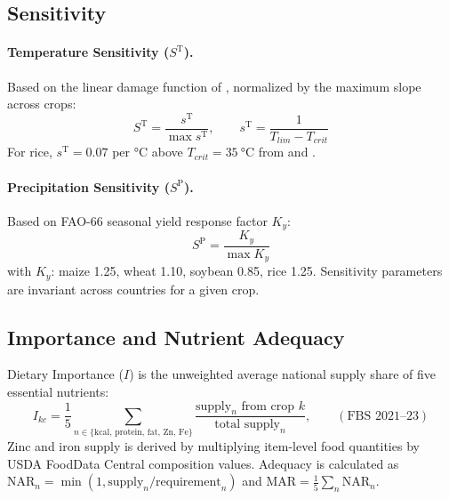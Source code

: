\documentclass[11pt,a4paper]{article}
\let\textcite\citet
\newcommand{\TT}{\mathrm{T}}   %
\newcommand{\PP}{\mathrm{P}}   %
\begin{document}
\subsection{Sensitivity}
\paragraph{Temperature Sensitivity ($S^{\TT}$).} Based on the linear damage function of \textcite{deryng2014}, normalized by the maximum slope across crops:
\begin{equation}
S^{\TT} = \frac{s^{\TT}}{\max s^{\TT}},\qquad s^{\TT} = \frac{1}{T_{lim} - T_{crit}}
\end{equation}
For rice, $s^{\TT} = 0.07$ per \si{\celsius} above $T_{crit}=\SI{35}{\celsius}$ from \textcite{jagadish2007} and \textcite{yoshida1981}.

\paragraph{Precipitation Sensitivity ($S^{\PP}$).} Based on FAO-66 seasonal yield response factor $K_y$:
\begin{equation}
S^{\PP} = \frac{K_y}{\max K_y}
\end{equation}
with $K_y$: maize 1.25, wheat 1.10, soybean 0.85, rice 1.25. Sensitivity parameters are invariant across countries for a given crop.

\begin{table}[H]\centering\small

\caption{Literature parameters used in Exposure and Sensitivity.}
\end{table}

\subsection{Importance and Nutrient Adequacy}
Dietary Importance ($I$) is the unweighted average national supply share of five essential nutrients:
\begin{equation}
I_{kc} = \frac{1}{5}\sum_{n \in \{\mathrm{kcal,\,protein,\,fat,\,Zn,\,Fe}\}} \frac{\text{supply}_n\text{ from crop }k}{\text{total supply}_n},\qquad (\text{FBS 2021--23})
\end{equation}
Zinc and iron supply is derived by multiplying item-level food quantities by USDA FoodData Central composition values. Adequacy is calculated as $\mathrm{NAR}_n = \min(1, \text{supply}_n / \text{requirement}_n)$ and $\mathrm{MAR} = \tfrac15 \sum_n \mathrm{NAR}_n$.
\end{document}
